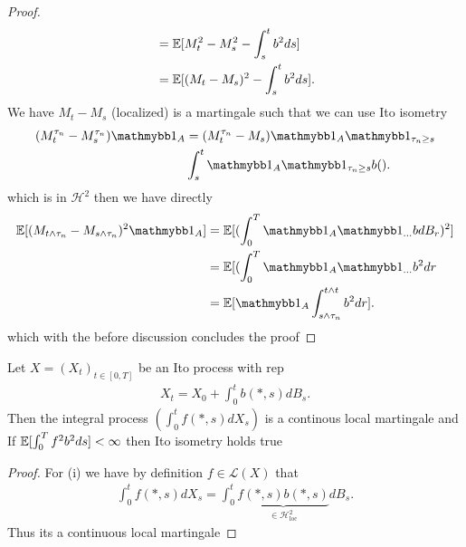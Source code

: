 \begin{proof}
\begin{align*}
  &=\mathbb{E}[M_t^2-M_s^2 - \int_s^{t} b^2 ds ] \\
  &= \mathbb{E}[(M_t-M_s)^2 - \int_s^{t} b^2 ds]
.\end{align*}
We have $M_t - M_s$ (localized) is a martingale such that we can use Ito isometry 
\begin{align*}
  (M_t^{\tau_n} - M_s^{\tau_n})\cha_A &=  (M_t^{\tau_n} - M_s)\cha_A \cha_{\tau_n \ge s} \\
                                      &\int_s^{t} \cha_A\cha_{\tau_n\ge s}b()
.\end{align*}
which is in $\mathcal{H}^2$ then we have directly 
\begin{align*}
  \E[(M_{t\land \tau_n}-M_{s \land \tau_n})^2 \cha_A] &= \E[(\int_0^{T} \cha_A\cha_{\ldots } b dB_r)^2]\\
                                                      &=  \E[(\int_0^{T} \cha_A\cha_{\ldots } b^2 dr\\
                                                      &= \E[\cha_A \int_{s\land \tau_n}^{t \land t }b^2 dr ]
.\end{align*}
which with the before discussion concludes the proof
\end{proof}
\begin{Lemma}[4.5]
  Let $X = (X_t)_{t \in [0,T]}$  be an Ito process with rep 
  \begin{align*}
    X_t = X_0 + \int_0^{t} b(*,s) dB_s
  .\end{align*}
  Then the integral process $(\int_0^{t} f(*,s) dX_s )$ is a continous local martingale  and 
  If $\mathbb{E}[\int_0^{T} f^2 b^2 ds] <\infty$ then Ito isometry holds true
\end{Lemma}
\begin{proof}
 For (i)  we have by definition $f \in \mathcal{L}(X)$ that 
 \begin{align*}
   \int_0^{t} f(*,s)dX_s = \int_0^{t} \underbrace{f(*,s)b(*,s)}_{\in  \mathcal{H}^2_{\text{loc}}}dB_s   
 .\end{align*}
 Thus its  a continuous local martingale
\end{proof}
